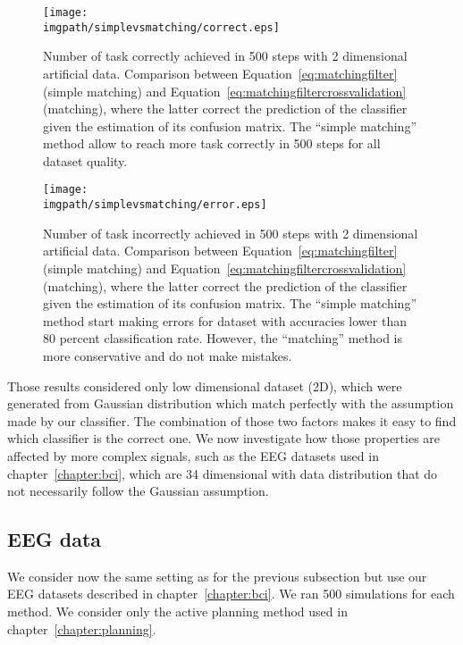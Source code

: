 \begin{figure}[!htbp]
\centering
\texttt{[image: \\imgpath/simplevsmatching/correct.eps]}
\caption{Number of task correctly achieved in 500 steps with 2 dimensional artificial data. Comparison between Equation~\ref{eq:matchingfilter} (simple matching) and Equation~\ref{eq:matchingfiltercrossvalidation} (matching), where the latter correct the prediction of the classifier given the estimation of its confusion matrix. The ``simple matching'' method allow to reach more task correctly in 500 steps for all dataset quality.
}
\label{fig:nCorrect_simplevsmatching}
\end{figure} 

\begin{figure}[!htbp]
\centering
\texttt{[image: \\imgpath/simplevsmatching/error.eps]}
\caption{Number of task incorrectly achieved in 500 steps with 2 dimensional artificial data. Comparison between Equation~\ref{eq:matchingfilter} (simple matching) and Equation~\ref{eq:matchingfiltercrossvalidation} (matching), where the latter correct the prediction of the classifier given the estimation of its confusion matrix. The ``simple matching'' method start making errors for dataset with accuracies lower than 80 percent classification rate. However, the ``matching'' method is more conservative and do not make mistakes.}
\label{fig:nWrongEEG_simplevsmatching}
\end{figure} 

\transition

Those results considered only low dimensional dataset (2D), which were generated from Gaussian distribution which match perfectly with the assumption made by our classifier. The combination of those two factors makes it easy to find which classifier is the correct one. We now investigate how those properties are affected by more complex signals, such as the EEG datasets used in chapter~\ref{chapter:bci}, which are 34 dimensional with data distribution that do not necessarily follow the Gaussian assumption.

\subsection{EEG data}

We consider now the same setting as for the previous subsection but use our EEG datasets described in chapter~\ref{chapter:bci}. We ran 500 simulations for each method. We consider only the active planning method used in chapter~\ref{chapter:planning}.

